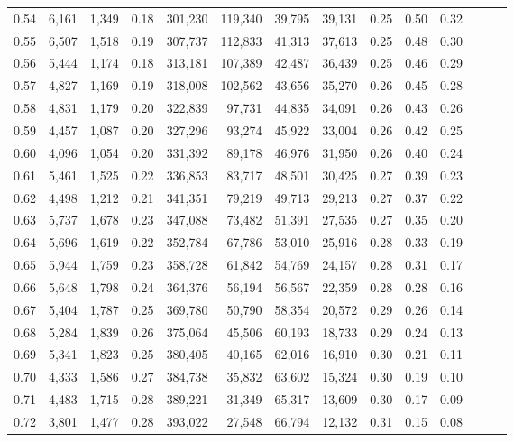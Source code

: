 \begin{tabular}{rrrrrrrrrrrrrr}
0.54 &  6,161 &  1,349 &  0.18 &  301,230 &  119,340 &  39,795 &  39,131 &  0.25 &  0.50 &      0.32 \\
0.55 &  6,507 &  1,518 &  0.19 &  307,737 &  112,833 &  41,313 &  37,613 &  0.25 &  0.48 &      0.30 \\
0.56 &  5,444 &  1,174 &  0.18 &  313,181 &  107,389 &  42,487 &  36,439 &  0.25 &  0.46 &      0.29 \\
0.57 &  4,827 &  1,169 &  0.19 &  318,008 &  102,562 &  43,656 &  35,270 &  0.26 &  0.45 &      0.28 \\
0.58 &  4,831 &  1,179 &  0.20 &  322,839 &   97,731 &  44,835 &  34,091 &  0.26 &  0.43 &      0.26 \\
0.59 &  4,457 &  1,087 &  0.20 &  327,296 &   93,274 &  45,922 &  33,004 &  0.26 &  0.42 &      0.25 \\
0.60 &  4,096 &  1,054 &  0.20 &  331,392 &   89,178 &  46,976 &  31,950 &  0.26 &  0.40 &      0.24 \\
0.61 &  5,461 &  1,525 &  0.22 &  336,853 &   83,717 &  48,501 &  30,425 &  0.27 &  0.39 &      0.23 \\
0.62 &  4,498 &  1,212 &  0.21 &  341,351 &   79,219 &  49,713 &  29,213 &  0.27 &  0.37 &      0.22 \\
0.63 &  5,737 &  1,678 &  0.23 &  347,088 &   73,482 &  51,391 &  27,535 &  0.27 &  0.35 &      0.20 \\
0.64 &  5,696 &  1,619 &  0.22 &  352,784 &   67,786 &  53,010 &  25,916 &  0.28 &  0.33 &      0.19 \\
0.65 &  5,944 &  1,759 &  0.23 &  358,728 &   61,842 &  54,769 &  24,157 &  0.28 &  0.31 &      0.17 \\
0.66 &  5,648 &  1,798 &  0.24 &  364,376 &   56,194 &  56,567 &  22,359 &  0.28 &  0.28 &      0.16 \\
0.67 &  5,404 &  1,787 &  0.25 &  369,780 &   50,790 &  58,354 &  20,572 &  0.29 &  0.26 &      0.14 \\
0.68 &  5,284 &  1,839 &  0.26 &  375,064 &   45,506 &  60,193 &  18,733 &  0.29 &  0.24 &      0.13 \\
0.69 &  5,341 &  1,823 &  0.25 &  380,405 &   40,165 &  62,016 &  16,910 &  0.30 &  0.21 &      0.11 \\
0.70 &  4,333 &  1,586 &  0.27 &  384,738 &   35,832 &  63,602 &  15,324 &  0.30 &  0.19 &      0.10 \\
0.71 &  4,483 &  1,715 &  0.28 &  389,221 &   31,349 &  65,317 &  13,609 &  0.30 &  0.17 &      0.09 \\
0.72 &  3,801 &  1,477 &  0.28 &  393,022 &   27,548 &  66,794 &  12,132 &  0.31 &  0.15 &      0.08 \\

\end{tabular}

